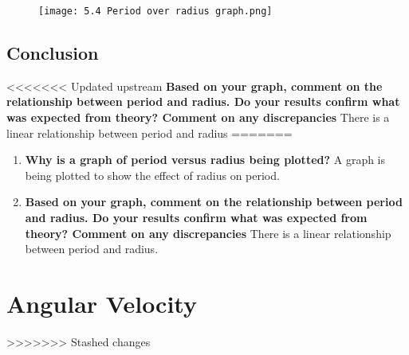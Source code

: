 		\begin{figure}[H]
			\centering
			\texttt{[image: 5.4 Period over radius graph.png]}
		\end{figure}

	\subsection{Conclusion}
<<<<<<< Updated upstream
		\textbf{Based on your graph, comment on the relationship between period and radius. Do your results confirm what was expected from theory? Comment on any discrepancies}
		There is a linear relationship between period and radius
=======
	\begin{enumerate}
		\item \textbf{Why is a graph of period versus radius being plotted?}
			\subitem A graph is being plotted to show the effect of radius on period.
		\item \textbf{Based on your graph, comment on the relationship between period and radius. Do your results confirm what was expected from theory? Comment on any discrepancies}
			\subitem There is a linear relationship between period and radius.
	\end{enumerate}

\section{Angular Velocity} \label{18/11/2024}
>>>>>>> Stashed changes
